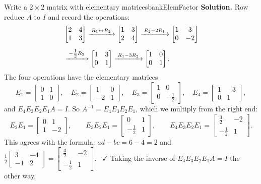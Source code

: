 \documentclass[11pt]{article}
\begin{document}
\begin{exmp}{Write a $2\times2$ matrix with elementary matrices}{bankElemFactor}
\textbf{Solution.} Row reduce $A$ to $I$ and record the operations:
\begin{align*}
&\begin{bmatrix}2&4\\1&3\end{bmatrix}
\xrightarrow{\;R_1\leftrightarrow R_2\;}
\begin{bmatrix}1&3\\2&4\end{bmatrix}
\xrightarrow{\;R_2-2R_1\;}
\begin{bmatrix}1&3\\0&-2\end{bmatrix}\\[4pt]
&\xrightarrow{\;-\tfrac12R_2\;}
\begin{bmatrix}1&3\\0&1\end{bmatrix}
\xrightarrow{\;R_1-3R_2\;}
\begin{bmatrix}1&0\\0&1\end{bmatrix}.
\end{align*}
The four operations have the elementary matrices
\[
E_1=\begin{bmatrix}0&1\\1&0\end{bmatrix},\quad E_2=\begin{bmatrix}1&0\\-2&1\end{bmatrix},\quad E_3=\begin{bmatrix}1&0\\0&-\tfrac12\end{bmatrix},\quad E_4=\begin{bmatrix}1&-3\\0&1\end{bmatrix},
\]
and $E_4E_3E_2E_1A=I$. So $A^{-1}=E_4E_3E_2E_1$, which we multiply from the right end:
\[
E_2E_1=\begin{bmatrix}0&1\\1&-2\end{bmatrix},\qquad E_3E_2E_1=\begin{bmatrix}0&1\\-\tfrac12&1\end{bmatrix},\qquad E_4E_3E_2E_1=\begin{bmatrix}\tfrac32&-2\\-\tfrac12&1\end{bmatrix}.
\]
This agrees with the formula: $ad-bc=6-4=2$ and $\frac12\begin{bmatrix}3&-4\\-1&2\end{bmatrix}=\begin{bmatrix}\tfrac32&-2\\-\tfrac12&1\end{bmatrix}$. \ $\checkmark$ Taking the inverse of $E_4E_3E_2E_1A=I$ the other way,

\end{exmp}
\end{document}
